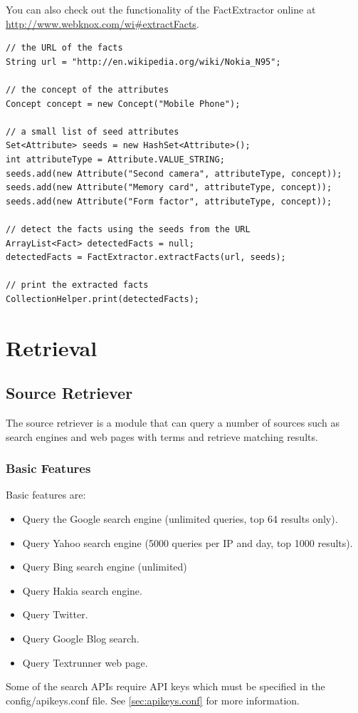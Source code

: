 \documentclass[a4paper,twoside]{book}      %
\begin{document}
You can also check out the functionality of the FactExtractor online at \url{http://www.webknox.com/wi#extractFacts}.

\begin{codelisting}
\begin{lstlisting}[label=listing:factExtraction,caption=Extract a list of facts from a web page.,frame=tb]
// the URL of the facts
String url = "http://en.wikipedia.org/wiki/Nokia_N95";

// the concept of the attributes
Concept concept = new Concept("Mobile Phone");

// a small list of seed attributes
Set<Attribute> seeds = new HashSet<Attribute>();
int attributeType = Attribute.VALUE_STRING;
seeds.add(new Attribute("Second camera", attributeType, concept));
seeds.add(new Attribute("Memory card", attributeType, concept));
seeds.add(new Attribute("Form factor", attributeType, concept));

// detect the facts using the seeds from the URL
ArrayList<Fact> detectedFacts = null;
detectedFacts = FactExtractor.extractFacts(url, seeds);
		
// print the extracted facts
CollectionHelper.print(detectedFacts);
\end{lstlisting}
\end{codelisting}

\section{Retrieval}

\subsection{Source Retriever}
The source retriever is a module that can query a number of sources such as search engines and web pages with terms and retrieve matching results.
\subsubsection{Basic Features}
Basic features are:
\begin{itemize}
\item Query the Google search engine (unlimited queries, top 64 results only).
\item Query Yahoo search engine (5000 queries per IP and day, top 1000 results).
\item Query Bing search engine (unlimited)
\item Query Hakia search engine.
\item Query Twitter.
\item Query Google Blog search.
\item Query Textrunner web page.
\end{itemize}
Some of the search APIs require API keys which must be specified in the config/apikeys.conf file. See \ref{sec:apikeys.conf} for more information.
\end{document}
